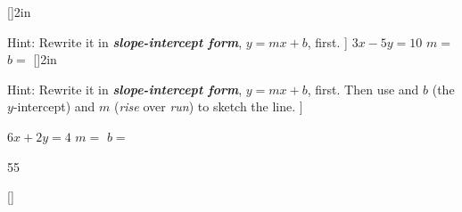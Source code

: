 \documentclass[12pt,letterpaper]{memoir}
\begin{document}
\pagestyle{empty}
\checkandfixthelayout
\raggedbottom

\forONLEVEL


\def\setdateformat{A,\ d\ B\ Y} %

\begin{myWarmupProblems}[]
    \setcounter{MyProblemCounter}{1}
    [\LARGE]{2in}
\end{myWarmupProblems}


\begin{myWarmupProblems}[]
    \setcounter{MyProblemCounter}{1}
    \myWideProblem[%
        Find the slope, $m$, and $y$-intercept, $b$ for this equation.\\[1em]
        Hint: Rewrite it in {\bfseries\itshape slope-intercept form}, $y=mx+b$, first.
        ]
    {
        \centering
        $3x - 5y = 10$ \hfil $m =$  \hfil $b=$ 
    }[\LARGE]{2in}
\end{myWarmupProblems}


\begin{myWarmupProblems}[]
    \setcounter{MyProblemCounter}{1}
    \myWideProblemWithContent[
        Sketch the graph of the line for this equation.\\[1em]
        Hint: Rewrite it in {\bfseries\itshape slope-intercept form}, $y=mx+b$, first.
        Then use and $b$ (the $y$-intercept) and $m$ ({\itshape rise} over {\itshape run}) 
        to sketch the line.
        ]
    {
        \centering
        $6x + 2y = 4$ \hfil $m=$  \hfil $b=$  \\[2em]
        \begin{myTikzpictureGrid}{0.5} {5}{5}
        \end{myTikzpictureGrid}    
    }[\LARGE]
\end{myWarmupProblems}
\end{document}
